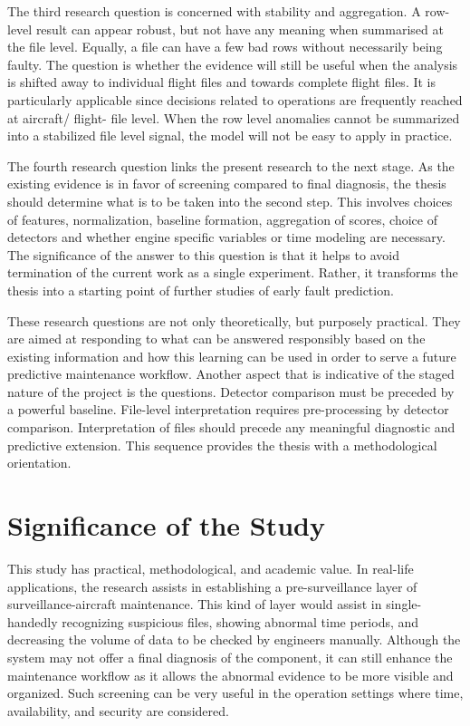 \documentclass[12pt,a4paper]{report}
\begin{document}
	The third research question is concerned with stability and aggregation. A row-level result can appear robust, but not have any meaning when summarised at the file level. Equally, a file can have a few bad rows without necessarily being faulty. The question is whether the evidence will still be useful when the analysis is shifted away to individual flight files and towards complete flight files. It is particularly applicable since decisions related to operations are frequently reached at aircraft/ flight- file level. When the row level anomalies cannot be summarized into a stabilized file level signal, the model will not be easy to apply in practice.
	
	The fourth research question links the present research to the next stage. As the existing evidence is in favor of screening compared to final diagnosis, the thesis should determine what is to be taken into the second step. This involves choices of features, normalization, baseline formation, aggregation of scores, choice of detectors and whether engine specific variables or time modeling are necessary. The significance of the answer to this question is that it helps to avoid termination of the current work as a single experiment. Rather, it transforms the thesis into a starting point of further studies of early fault prediction.
	
	These research questions are not only theoretically, but purposely practical. They are aimed at responding to what can be answered responsibly based on the existing information and how this learning can be used in order to serve a future predictive maintenance workflow. Another aspect that is indicative of the staged nature of the project is the questions. Detector comparison must be preceded by a powerful baseline. File-level interpretation requires pre-processing by detector comparison. Interpretation of files should precede any meaningful diagnostic and predictive extension. This sequence provides the thesis with a methodological orientation.
	
	\section{Significance of the Study}
	
	This study has practical, methodological, and academic value. In real-life applications, the research assists in establishing a pre-surveillance layer of surveillance-aircraft maintenance. This kind of layer would assist in single-handedly recognizing suspicious files, showing abnormal time periods, and decreasing the volume of data to be checked by engineers manually. Although the system may not offer a final diagnosis of the component, it can still enhance the maintenance workflow as it allows the abnormal evidence to be more visible and organized. Such screening can be very useful in the operation settings where time, availability, and security are considered.
	
\end{document}
